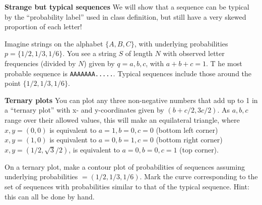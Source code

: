 \documentclass[twocolumn,answers]{exam}
\begin{document}
\begin{questions}
\question 

\textbf{Strange but typical sequences} We will show that a sequence can be
typical by the “probability label” used in class definition, but still have a
very skewed proportion of each letter!

Imagine strings on the alphabet $\{A,B,C\}$, with underlying probabilities
$p=\{1/2,1/3,1/6\}$. You see a string $S$ of length $N$ with observed letter
frequencies (divided by $N$) given by $q = {a, b, c}$, with $a + b + c = 1$. T
he most probable sequence is \texttt{AAAAAAA.....}.
Typical sequences include those around the point $\{1/2,1/3,1/6\}$.


\bonusquestion[10] \textbf{Ternary plots}
You can plot any three non-negative numbers that add up to 1 in a “ternary plot” with
x- and y-coordinates given by $(b + c/2, 3c/2)$. As $a, b, c$ range over their
allowed values, this will make an equilateral triangle,
where $x, y = (0,0)$ is equivalent to ${a = 1, b = 0, c = 0}$ (bottom left corner)
$x, y = (1,0)$ is equivalent to ${a = 0, b = 1, c = 0}$ (bottom right corner)
$x, y =(1/2, \sqrt{3}/2)$, is equivalent to ${a = 0, b = 0, c = 1}$ (top
corner).

On a ternary plot, make a contour plot of probabilities of sequences assuming
underlying probabilities $=(1/2,1/3,1/6)$. Mark the curve corresponding to the
set of sequences with probabilities similar to that of the typical sequence.
Hint: this can all be done by hand.

\end{questions}
\end{document}
